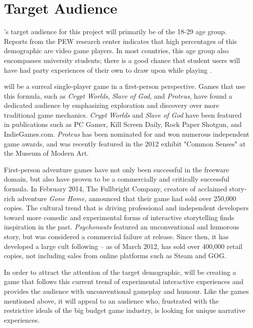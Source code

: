 \section{Target Audience}
\ourteam{}'s target audience for this project will primarily be of the 18-29 age group. Reports from the PEW research center indicates that high percentages of this demographic are video game players. In most countries, this age group also encompasses university students; there is a good chance that student users will have had party experiences of their own to draw upon while playing \ourgame{}.

\ourgame{} will be a surreal single-player game in a first-person perspective. Games that use this formula, such as \textit{Crypt Worlds}, \textit{Slave of God}, and \textit{Proteus}, have found a dedicated audience by emphasizing exploration and discovery over more traditional game mechanics. \textit{Crypt Worlds} and \textit{Slave of God} have been featured in publications such as PC Gamer, Kill Screen Daily, Rock Paper Shotgun, and IndieGames.com. \textit{Proteus} has been nominated for and won numerous independent game awards, and was recently featured in the 2012 exhibit "Common Senses" at the Museum of Modern Art.

First-person adventure games have not only been successful in the freeware domain, but also have proven to be a commercially and critically successful formula. In February 2014, The Fullbright Company, creators of acclaimed story-rich adventure \textit{Gone Home}, announced that their game had sold over 250,000 copies. The cultural trend that is driving professional and independent developers toward more comedic and experimental forms of interactive storytelling finds inspiration in the past. \textit{Psychonauts} featured an unconventional and humorous story, but was considered a commercial failure at release. Since then, it has developed a large cult following -- as of March 2012, has sold over 400,000 retail copies, not including sales from online platforms such as Steam and GOG.

In order to attract the attention of the target demographic, \ourteam{} will be creating a game that follows this current trend of experimental interactive experiences and provides the audience with unconventional gameplay and humour. Like the games mentioned above, it will appeal to an audience who, frustrated with the restrictive ideals of the big budget game industry, is looking for unique narrative experiences.